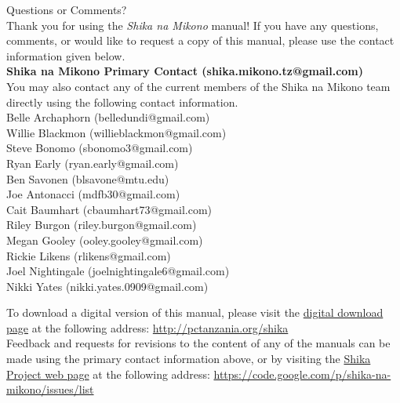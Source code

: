 \begin{center}
{\Huge Questions or Comments?}\\[12pt]
Thank you for using the \textit{Shika na Mikono} manual! If you have any questions, comments, or would like to request a copy of this manual, please use the contact information given below.\\[20pt]
\textbf{Shika na Mikono Primary Contact (shika.mikono.tz@gmail.com)}\\[20pt]
You may also contact any of the current members of the Shika na Mikono team directly using the following contact information.\\[20pt]
Belle Archaphorn (belledundi@gmail.com)\\
Willie Blackmon (willieblackmon@gmail.com)\\
Steve Bonomo (sbonomo3@gmail.com)\\
Ryan Early (ryan.early@gmail.com)\\
Ben Savonen (blsavone@mtu.edu)\\
\vspace{6pt}
Joe Antonacci (mdfb30@gmail.com)\\
Cait Baumhart (cbaumhart73@gmail.com)\\
Riley Burgon (riley.burgon@gmail.com)\\
Megan Gooley (ooley.gooley@gmail.com)\\
Rickie Likens (rlikens@gmail.com)\\
Joel Nightingale (joelnightingale6@gmail.com)\\
Nikki Yates (nikki.yates.0909@gmail.com)\\


\end{center}
\vfill
To download a digital version of this manual, please visit the \href{http://pctanzania.org/shika}{digital download page} at the following address: \url{http://pctanzania.org/shika}\\

\noindent Feedback and requests for revisions to the content of any of the manuals can be made using the primary contact information above, or by visiting the \href{https://code.google.com/p/shika-na-mikono/issues/list}{Shika Project web page} at the following address: \url{https://code.google.com/p/shika-na-mikono/issues/list}